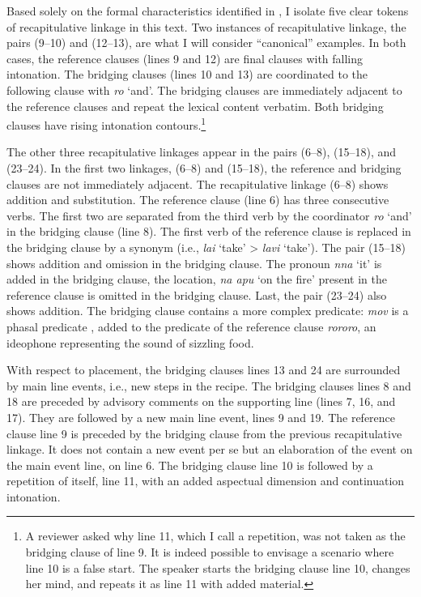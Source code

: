 \documentclass[output=paper]{LSP/langsci}
\begin{document}
Based solely on the formal characteristics identified in , I isolate five clear tokens of recapitulative linkage in this text. Two instances of recapitulative linkage, the pairs (9--10) and (12--13), are what I will consider ``canonical'' examples. In both cases, the reference clauses (lines 9 and 12) are final clauses with falling intonation.  The bridging clauses (lines 10 and 13) are coordinated to the following clause with \textit{ro} `and'. The bridging clauses are immediately adjacent to the reference clauses and repeat the lexical content verbatim. Both bridging clauses have rising intonation contours.\footnote{A reviewer asked why line 11, which I call a repetition, was not taken as the bridging clause of line 9. It is indeed possible to envisage a scenario where line 10 is a false start. The speaker starts the bridging clause line 10, changes her mind, and repeats it as line 11 with added  material.}  

The other three recapitulative linkages appear in the pairs (6--8), (15--18), and (23--24). In the first two linkages, (6--8) and (15--18), the reference and bridging clauses are not immediately adjacent. The recapitulative linkage (6--8) shows addition and substitution. The reference clause (line 6) has three consecutive verbs. The first two are separated from the third verb by the coordinator \textit{ro} `and' in the bridging clause (line 8). The first verb of the reference clause is replaced in the bridging clause by a synonym (i.e., \textit{lai} `take' > \textit{lavi} `take'). The pair (15--18) shows addition and omission in the bridging clause. The pronoun \textit{nna} `it' is added in the bridging clause, the location, \textit{na apu} `on the fire' present in the reference clause is omitted in the bridging clause. Last, the pair (23--24) also shows addition. The bridging clause contains a more complex predicate: \textit{mov} is a phasal predicate \citep[][342]{guerin11}, added to the predicate of the reference clause \textit{rororo}, an ideophone representing the sound of sizzling food. 

With respect to placement, the bridging clauses lines 13 and 24 are surrounded by main line events, i.e., new steps in the recipe. The bridging clauses lines 8 and 18 are preceded by advisory comments on the supporting line (lines 7, 16, and 17). They are followed by a new main line event, lines 9 and 19. The reference clause line 9 is preceded by the bridging clause from the previous recapitulative linkage. It does not contain a new event per se but an elaboration of the event on the main event line, on line 6. The bridging clause line 10 is followed by a repetition of itself, line 11, with an added aspectual dimension and continuation intonation. 
\end{document}
